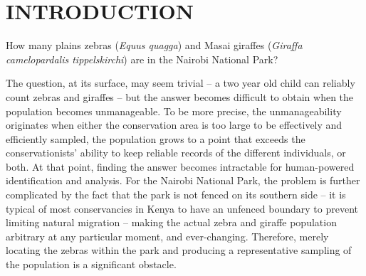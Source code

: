 
\chapter{INTRODUCTION} \label{sec:introduction}

How many plains zebras (\textit{Equus quagga}) and Masai giraffes (\textit{Giraffa camelopardalis tippelskirchi}) are in the Nairobi National Park?

The question, at its surface, may seem trivial -- a two year old child can reliably count zebras and giraffes -- but the answer becomes difficult to obtain when the population becomes unmanageable.  To be more precise, the unmanageability originates when either the conservation area is too large to be effectively and efficiently sampled, the population grows to a point that exceeds the conservationists' ability to keep reliable records of the different individuals, or both.  At that point, finding the answer becomes intractable for human-powered identification and analysis.  For the Nairobi National Park, the problem is further complicated by the fact that the park is not fenced on its southern side -- it is typical of most conservancies in Kenya to have an unfenced boundary to prevent limiting natural migration -- making the actual zebra and giraffe population arbitrary at any particular moment, and ever-changing.  Therefore, merely locating the zebras within the park and producing a representative sampling of the population is a significant obstacle.

